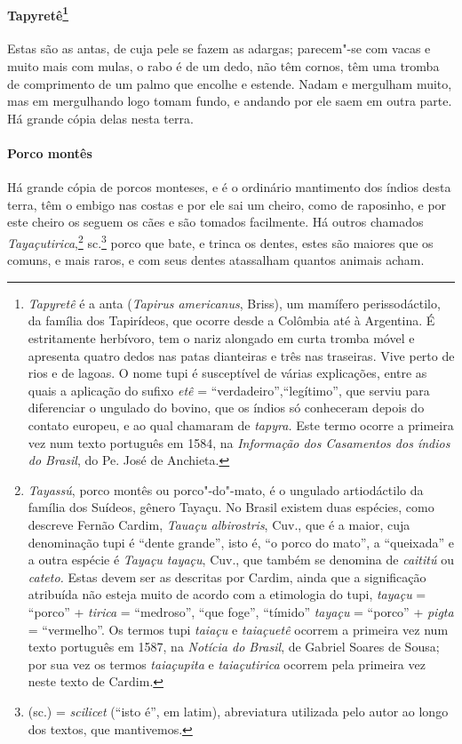 \paragraph{Tapyretê\footnote{ \textit{Tapyretê} é a anta
(\textit{Tapirus americanus}, Briss), um mamífero
perissodáctilo, da família dos Tapirídeos, que ocorre desde a Colômbia
até à Argentina. É estritamente herbívoro, tem o nariz alongado em
curta tromba móvel e apresenta quatro dedos nas patas dianteiras e três
nas traseiras. Vive perto de rios e de lagoas. O nome tupi é
susceptível de várias explicações, entre as quais a aplicação do sufixo
\textit{etê} = ``verdadeiro'',``legítimo'', que serviu para diferenciar o
ungulado do bovino, que os índios só conheceram depois do contato
europeu, e ao qual chamaram de \textit{tapyra.} Este termo ocorre a
primeira vez num texto português em 1584, na \textit{Informação dos
Casamentos dos índios do Brasil}, do Pe. José de Anchieta.} }
Estas são as antas, de cuja pele se fazem as adargas; parecem"-se com
vacas e muito mais com mulas, o rabo é de um dedo, não têm cornos, têm
uma tromba de comprimento de um palmo que encolhe e estende. Nadam e
mergulham muito, mas em mergulhando logo tomam fundo, e andando por ele
saem em outra parte. Há grande cópia delas nesta terra.

\paragraph{Porco montês} Há grande cópia de porcos monteses, e é o
ordinário mantimento dos índios desta terra, têm o embigo nas costas e
por ele sai um cheiro, como de raposinho, e por este cheiro os seguem
os cães e são tomados facilmente. Há outros chamados
\textit{Tayaçutirica},\footnote{ \textit{Tayassú}, porco
montês ou porco"-do"-mato, é o ungulado artiodáctilo da família dos
Suídeos, gênero Tayaçu. No Brasil existem duas espécies, como descreve
Fernão Cardim, \textit{Tauaçu albirostris}, Cuv., que é a maior, cuja
denominação tupi é ``dente grande'', isto é, ``o porco do mato'', a ``queixada'' 
e a outra espécie é \textit{Tayaçu tayaçu}, Cuv., que também
se denomina de \textit{caititú} ou \textit{cateto.} Estas devem ser as
descritas por Cardim, ainda que a significação atribuída não esteja
muito de acordo com a etimologia do tupi, \textit{tayaçu} = ``porco'' +
\textit{tirica} = ``medroso'', ``que foge'', ``tímido'' \textit{tayaçu} = 
``porco'' + \textit{pigta} = ``vermelho''. Os termos tupi \textit{taiaçu}
e \textit{taiaçuetê} ocorrem a primeira vez num texto português em
1587, na \textit{Notícia do Brasil}, de Gabriel Soares de Sousa; por
sua vez os termos \textit{taiaçupita} e \textit{taiaçutirica} ocorrem
pela primeira vez neste texto de Cardim.} sc.\footnote{ (sc.) = \textit{scilicet} (``isto é'', em latim), abreviatura utilizada pelo autor 
ao longo dos textos, que mantivemos.} porco que bate, e trinca os
dentes, estes são maiores que os comuns, e mais raros, e com seus
dentes atassalham quantos animais acham.

